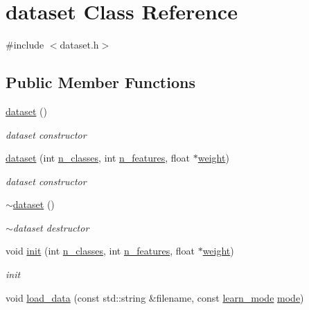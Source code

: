 \hypertarget{classdataset}{\section{dataset Class Reference}
\label{classdataset}
}


{\ttfamily \#include $<$dataset.\+h$>$}

\subsection*{Public Member Functions}
\begin{DoxyCompactItemize}
\item 
\hyperlink{classdataset_a7cb166d5282c5d6e66242764f9148a94}{dataset} ()
\begin{DoxyCompactList}\small\item\em dataset constructor \end{DoxyCompactList}\item 
\hyperlink{classdataset_acfaf71f71b7ddb95a77431e3663aa4a1}{dataset} (int \hyperlink{classdataset_aa33a77fd21cbed4019bfb5ed82e30c6b}{n\+\_\+classes}, int \hyperlink{classdataset_a5469ac8f1b5d64d836821e5056599b54}{n\+\_\+features}, float $\ast$\hyperlink{classdataset_ac6690ca832182b7cfa64da93a6ccd6ab}{weight})
\begin{DoxyCompactList}\small\item\em dataset constructor \end{DoxyCompactList}\item 
\hyperlink{classdataset_a770010cb1e1da07bea9ed9dd665a6d65}{$\sim$dataset} ()
\begin{DoxyCompactList}\small\item\em $\sim$dataset destructor \end{DoxyCompactList}\item 
void \hyperlink{classdataset_a53d6ced8ba17a1ff4771ab53ffda85ef}{init} (int \hyperlink{classdataset_aa33a77fd21cbed4019bfb5ed82e30c6b}{n\+\_\+classes}, int \hyperlink{classdataset_a5469ac8f1b5d64d836821e5056599b54}{n\+\_\+features}, float $\ast$\hyperlink{classdataset_ac6690ca832182b7cfa64da93a6ccd6ab}{weight})
\begin{DoxyCompactList}\small\item\em init \end{DoxyCompactList}\item 
void \hyperlink{classdataset_a0bf2fba4da731ca757f0cb2bd95fe172}{load\+\_\+data} (const std\+::string \&filename, const \hyperlink{dataset_8h_a87dfee910993320c6720931fb701cc41}{learn\+\_\+mode} \hyperlink{classdataset_a47d44ca9cd02a4dc98ff80e0616a5aa9}{mode})

\end{DoxyCompactItemize}
